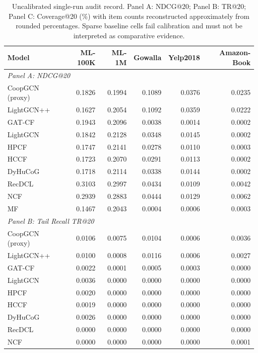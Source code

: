 \documentclass[a4paper,fleqn,longmktitle]{cas-dc}
\begin{document}
\begin{table}[t]
\centering
\caption{Uncalibrated single-run audit record. Panel A: NDCG@20; Panel B: TR@20; Panel C: Coverage@20 (\%) with item counts reconstructed approximately from rounded percentages. Sparse baseline cells fail calibration and must not be interpreted as comparative evidence.}
\label{tab:measured}
\scriptsize
\setlength{\tabcolsep}{3.2pt}
\begin{tabular}{lrrrrr}
\toprule
\textbf{Model} & \textbf{ML-100K} & \textbf{ML-1M} & \textbf{Gowalla} &
\textbf{Yelp2018} & \textbf{Amazon-Book}\\
\midrule
\multicolumn{6}{l}{\textit{Panel A: NDCG@20}}\\
CoopGCN (proxy) & 0.1826 & 0.1994 & 0.1089 & 0.0376 & 0.0235\\
LightGCN++ & 0.1627 & 0.2054 & 0.1092 & 0.0359 & 0.0222\\
GAT-CF & 0.1943 & 0.2096 & 0.0038 & 0.0014 & 0.0002\\
LightGCN & 0.1842 & 0.2128 & 0.0348 & 0.0145 & 0.0002\\
HPCF & 0.1747 & 0.2141 & 0.0278 & 0.0110 & 0.0003\\
HCCF & 0.1723 & 0.2070 & 0.0291 & 0.0113 & 0.0002\\
DyHuCoG & 0.1718 & 0.2114 & 0.0338 & 0.0144 & 0.0002\\
RecDCL & 0.3103 & 0.2997 & 0.0434 & 0.0109 & 0.0042\\
NCF & 0.2939 & 0.2883 & 0.0444 & 0.0129 & 0.0062\\
MF & 0.1467 & 0.2043 & 0.0004 & 0.0006 & 0.0003\\
\midrule
\multicolumn{6}{l}{\textit{Panel B: Tail Recall TR@20}}\\
CoopGCN (proxy) & 0.0106 & 0.0075 & 0.0104 & 0.0006 & 0.0036\\
LightGCN++ & 0.0100 & 0.0008 & 0.0116 & 0.0006 & 0.0027\\
GAT-CF & 0.0022 & 0.0001 & 0.0005 & 0.0003 & 0.0000\\
LightGCN & 0.0036 & 0.0000 & 0.0000 & 0.0000 & 0.0000\\
HPCF & 0.0020 & 0.0000 & 0.0000 & 0.0000 & 0.0000\\
HCCF & 0.0019 & 0.0000 & 0.0000 & 0.0000 & 0.0000\\
DyHuCoG & 0.0026 & 0.0000 & 0.0000 & 0.0000 & 0.0000\\
RecDCL & 0.0000 & 0.0000 & 0.0000 & 0.0000 & 0.0000\\
NCF & 0.0000 & 0.0000 & 0.0000 & 0.0000 & 0.0001\\

\end{tabular}
\end{table}
\end{document}
